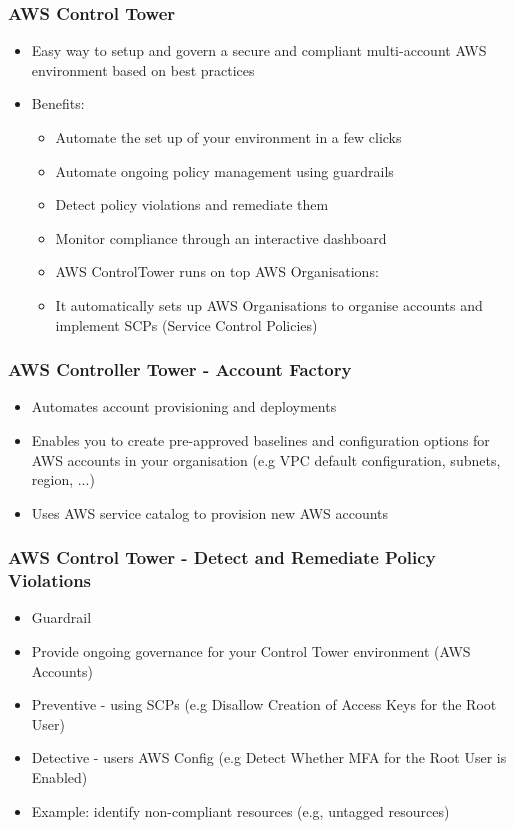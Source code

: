 \subsubsection{AWS Control Tower}
\begin{itemize}
    \item Easy way to setup and govern a secure and compliant multi-account AWS environment based on best practices
    \item Benefits:
    \begin{itemize}
        \item Automate the set up of your environment in a few clicks
        \item Automate ongoing policy management using guardrails
        \item Detect policy violations and remediate them
        \item Monitor compliance through an interactive dashboard
        \item AWS ControlTower runs on top AWS Organisations:
        \item It automatically sets up AWS Organisations to organise accounts and implement SCPs (Service Control Policies)
    \end{itemize}
\end{itemize}

\subsubsection{AWS Controller Tower - Account Factory}
\begin{itemize}
    \item Automates account provisioning and deployments
    \item Enables you to create pre-approved baselines and configuration options for AWS accounts in your organisation (e.g VPC default configuration, subnets, region, ...)
    \item Uses AWS service catalog to provision new AWS accounts
\end{itemize}

\subsubsection{AWS Control Tower - Detect and Remediate Policy Violations}
\begin{itemize}
    \item Guardrail
    \item Provide ongoing governance for your Control Tower environment (AWS Accounts)
    \item Preventive - using SCPs (e.g Disallow Creation of Access Keys for the Root User)
    \item Detective - users AWS Config (e.g Detect Whether MFA for the Root User is Enabled)
    \item Example: identify non-compliant resources (e.g, untagged resources)
\end{itemize}

